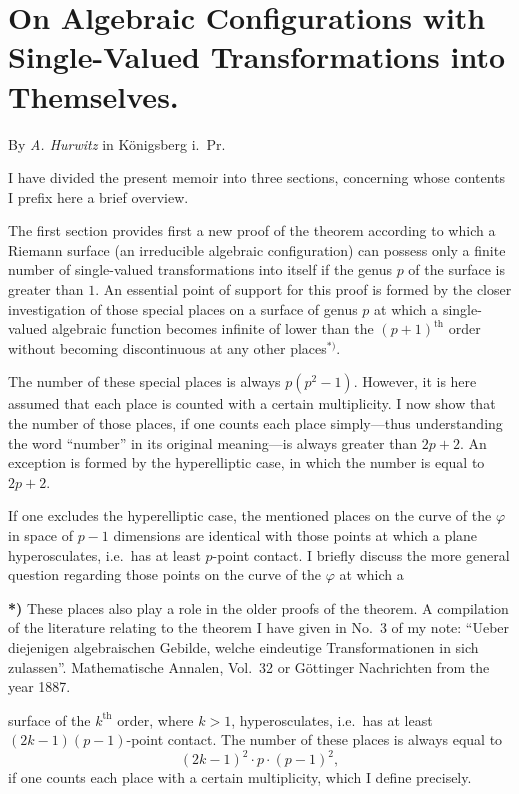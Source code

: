 \documentclass{article}
\begin{document}
\section*{On Algebraic Configurations with Single-Valued Transformations into Themselves.}

By \emph{A. Hurwitz} in Königsberg i.~Pr.

I have divided the present memoir into three sections, concerning whose contents I prefix here a brief overview.

The first section provides first a new proof of the theorem according to which a Riemann surface (an irreducible algebraic configuration) can possess only a finite number of single-valued transformations into itself if the genus $p$ of the surface is greater than $1$. An essential point of support for this proof is formed by the closer investigation of those special places on a surface of genus $p$ at which a single-valued algebraic function becomes infinite of lower than the $(p+1)^{\text{th}}$ order without becoming discontinuous at any other places${}^{*)}$.

The number of these special places is always $p(p^2 - 1)$. However, it is here assumed that each place is counted with a certain multiplicity. I now show that the number of those places, if one counts each place simply—thus understanding the word ``number'' in its original meaning—is always greater than $2p+2$. An exception is formed by the hyperelliptic case, in which the number is equal to $2p+2$.

If one excludes the hyperelliptic case, the mentioned places on the curve of the $\varphi$ in space of $p-1$ dimensions are identical with those points at which a plane hyperosculates, i.e.\ has at least $p$-point contact. I briefly discuss the more general question regarding those points on the curve of the $\varphi$ at which a

\textbf{*)} These places also play a role in the older proofs of the theorem. A compilation of the literature relating to the theorem I have given in No.~3 of my note: ``Ueber diejenigen algebraischen Gebilde, welche eindeutige Transformationen in sich zulassen''. Mathematische Annalen, Vol.~32 or Göttinger Nachrichten from the year 1887.

surface of the $k^{\text{th}}$ order, where $k > 1$, hyperosculates, i.e.\ has at least $(2k-1)(p-1)$-point contact. The number of these places is always equal to
\[
(2k-1)^2 \cdot p \cdot (p-1)^2,
\]
if one counts each place with a certain multiplicity, which I define precisely.
\end{document}
